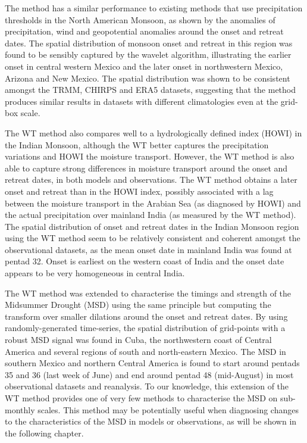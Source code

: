 The method has a similar performance to existing methods that use precipitation thresholds in the North American Monsoon, as shown by the anomalies of precipitation, wind and geopotential anomalies around the onset and retreat dates. 
The spatial distribution of monsoon onset and retreat in this region was found to be sensibly captured by the wavelet algorithm, illustrating the earlier onset in central western Mexico and the later onset in northwestern Mexico, Arizona and New Mexico. The spatial distribution was shown to be consistent amongst the TRMM, CHIRPS and ERA5 datasets, suggesting that the method produces similar results in datasets with different climatologies even at the grid-box scale.
 
The WT method also compares well to a hydrologically defined index (HOWI) in the Indian Monsoon, although the WT better captures the precipitation variations and HOWI the moisture transport. However, the WT method is also able to capture strong differences in moisture transport around the onset and retreat dates, in both models and observations. The WT method obtains a later onset and retreat than in the HOWI index, possibly associated with a lag between the moisture transport in the Arabian Sea (as diagnosed by HOWI) and the actual precipitation over mainland India (as measured by the WT method). The spatial distribution of onset and retreat dates in the Indian Monsoon region using the WT method seem to be relatively consistent and coherent amongst the observational datasets, as the mean onset date in mainland India was found at pentad 32.
Onset is earliest on the western coast of India and the onset date appears to be very homogeneous in central India.

The WT method was extended to characterise the timings and strength of the Midsummer Drought (MSD) using the same principle but computing the transform over smaller dilations around the onset and retreat dates.  By using randomly-generated time-series, the spatial distribution of grid-points with a robust MSD signal was found in Cuba, the northwestern coast of Central America and several regions of south and north-eastern Mexico.  The MSD in southern Mexico and northern Central America is found to start around pentads 35 and 36 (last week of June) and end around pentad 48 (mid-August) in most observational datasets and reanalysis. To our knowledge, this extension of the WT method provides one of very few methods to characterise the MSD on sub-monthly scales.
This method may be potentially useful when diagnosing changes to the characteristics of the MSD in models or observations, as will be shown in the following chapter. 


